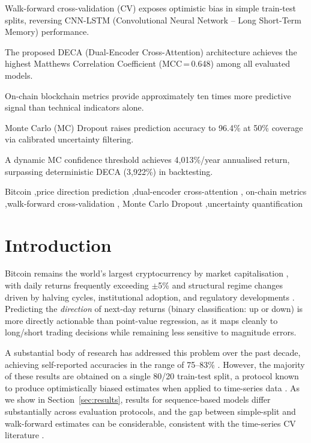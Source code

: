 \documentclass[final,3p,times,authoryear]{elsarticle}
\begin{document}
\begin{frontmatter}
\begin{highlights}
\item Walk-forward cross-validation (CV) exposes optimistic bias in simple train-test splits, reversing CNN-LSTM (Convolutional Neural Network -- Long Short-Term Memory) performance.
\item The proposed DECA (Dual-Encoder Cross-Attention) architecture achieves the highest Matthews Correlation Coefficient (MCC\,=\,0.648) among all evaluated models.
\item On-chain blockchain metrics provide approximately ten times more predictive signal than technical indicators alone.
\item Monte Carlo (MC) Dropout raises prediction accuracy to 96.4\% at 50\% coverage via calibrated uncertainty filtering.
\item A dynamic MC confidence threshold achieves 4{,}013\%/year annualised return, surpassing deterministic DECA (3{,}922\%) in backtesting.
\end{highlights}

\begin{keyword}
Bitcoin \sep price direction prediction \sep dual-encoder cross-attention \sep
on-chain metrics \sep walk-forward cross-validation \sep
Monte Carlo Dropout \sep uncertainty quantification
\end{keyword}

\end{frontmatter}

\section{Introduction}
\label{sec:intro}

Bitcoin remains the world's largest cryptocurrency by market
capitalisation \citep{coinmarketcap2024}, with daily returns frequently
exceeding $\pm$5\% and structural regime changes driven by halving
cycles, institutional adoption, and regulatory developments
\citep{baur2018bitcoin, dyhrberg2016bitcoin}.
Predicting the \emph{direction} of next-day returns (binary
classification: up or down) is more directly actionable than
point-value regression, as it maps cleanly to long/short trading
decisions while remaining less sensitive to magnitude errors.

A substantial body of research has addressed this problem over the past
decade, achieving self-reported accuracies in the range of 75--83\%
\citep{mcnally2018predicting, omole2024financial, omole2025eaai, dubey2025bitcoin}.
However, the majority of these results are obtained on a single 80/20
train-test split, a protocol known to produce optimistically biased
estimates when applied to time-series data
\citep{bergmeir2012time, tashman2000out}.
As we show in Section~\ref{sec:results}, results for sequence-based models
differ substantially across evaluation protocols, and the gap between
simple-split and walk-forward estimates can be considerable, consistent
with the time-series CV literature
\citep{bergmeir2012time, tashman2000out}.
\end{document}
